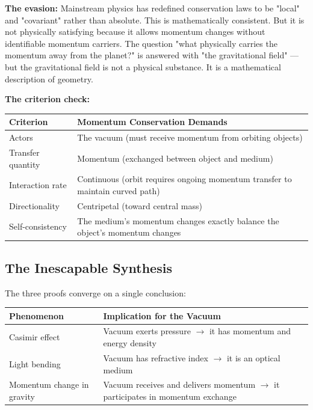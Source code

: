 \documentclass[12pt, a4paper]{article}
\begin{document}
\textbf{The evasion:} Mainstream physics has redefined conservation laws to be "local" and "covariant" rather than absolute. This is mathematically consistent. But it is not physically satisfying because it allows momentum changes without identifiable momentum carriers. The question "what physically carries the momentum away from the planet?" is answered with "the gravitational field" — but the gravitational field is not a physical substance. It is a mathematical description of geometry.

\textbf{The criterion check:}

\begin{center}
\begin{tabular}{|p{3cm}|p{10cm}|}
\hline
\textbf{Criterion} & \textbf{Momentum Conservation Demands} \\
\hline
Actors & The vacuum (must receive momentum from orbiting objects) \\
\hline
Transfer quantity & Momentum (exchanged between object and medium) \\
\hline
Interaction rate & Continuous (orbit requires ongoing momentum transfer to maintain curved path) \\
\hline
Directionality & Centripetal (toward central mass) \\
\hline
Self-consistency & The medium's momentum changes exactly balance the object's momentum changes \\
\hline
\end{tabular}
\end{center}

\subsection{The Inescapable Synthesis}
\label{subsec:synthesis}

The three proofs converge on a single conclusion:

\begin{center}
\begin{tabular}{|p{4cm}|p{10cm}|}
\hline
\textbf{Phenomenon} & \textbf{Implication for the Vacuum} \\
\hline
Casimir effect & Vacuum exerts pressure \(\rightarrow\) it has momentum and energy density \\
\hline
Light bending & Vacuum has refractive index \(\rightarrow\) it is an optical medium \\
\hline
Momentum change in gravity & Vacuum receives and delivers momentum \(\rightarrow\) it participates in momentum exchange \\
\hline
\end{tabular}
\end{center}
\end{document}
